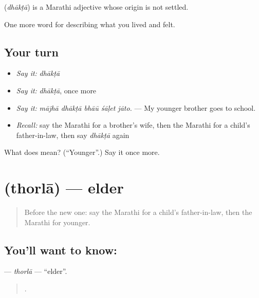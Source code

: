 \begin{cousinweb}
\textbf{} (\emph{dhākṭā}) is a Marathi adjective whose origin is not settled.
\end{cousinweb}

\begin{grammarlens}[title={What you've built}]
One more word for describing what you lived and felt.
\end{grammarlens}

\subsection*{Your turn}
\begin{itemize}
\raggedright
  \item \emph{Say it:} \emph{dhākṭā}
  \item \emph{Say it:} \emph{dhākṭā}, once more
  \item \emph{Say it:} \emph{mājhā dhākṭā bhāū śāḷet jāto.} — My younger brother goes to school.
  \item \emph{Recall:} say the Marathi for a brother's wife, then the Marathi for a child's father-in-law, then say \emph{dhākṭā} again
\end{itemize}

\begin{tcolorbox}[breakable,colback=teal!4,colframe=teal!35!black,title={Before you move on}]
What does  mean? (\textquotedblleft{}Younger\textquotedblright{}.) Say it once more.
\end{tcolorbox}
\section[\texorpdfstring{\mr{थोरला} (thorlā)}{थोरला (thorlā)}]{ (thorlā) — elder}

\label{lesson:MR-C497-thorla}



\begin{quote}
Before the new one: say the Marathi for a child's father-in-law, then the Marathi for younger.
\end{quote}

\subsection*{You'll want to know: }
\textbf{} — \emph{thorlā} — \textquotedblleft{}elder\textquotedblright{}.

\begin{quote}
    .
\end{quote}

